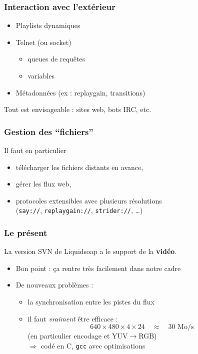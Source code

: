\documentclass{beamer}
\begin{document}
\begin{frame}
  \frametitle{Interaction avec l'extérieur}
  \begin{itemize}
  \item Playlists dynamiques
  \item Telnet (ou socket)
    \begin{itemize}
    \item queues de requêtes
    \item variables
    \end{itemize}
  \item Métadonnées (ex : replaygain, transitions)
  \end{itemize}

  \bigskip

  Tout est envisageable : sites web, bots IRC, etc.
\end{frame}

\begin{frame}[fragile]
  \frametitle{Gestion des ``fichiers''}

  Il faut en particulier
  \begin{itemize}
  \item télécharger les fichiers distants en avance,
  \item gérer les flux web,
  \item protocoles extensibles avec plusieurs résolutions\\
    (\verb+say://+, \verb+replaygain://+, \verb+strider://+, \ldots)
  \end{itemize}
\end{frame}

\begin{frame}
  \frametitle{Le présent}

  La version SVN de Liquidsoap a le support de la \textbf{vidéo}.
  \begin{itemize}
  \item Bon point : ça rentre très facilement dans notre cadre
  \item De nouveaux problèmes :
    \begin{itemize}
    \item la synchronisation entre les pistes du flux
    \item il faut \emph{vraiment} être efficace :
      \[
      640 \times 480 \times 4 \times 24 \quad\approx\quad 30\text{ Mo/s}
      \]
      (en particulier encodage et YUV$\to$RGB)\\
      $\Rightarrow$ codé en C, \texttt{gcc} avec optimisations
    \end{itemize}
  \end{itemize}

\end{frame}
\end{document}
